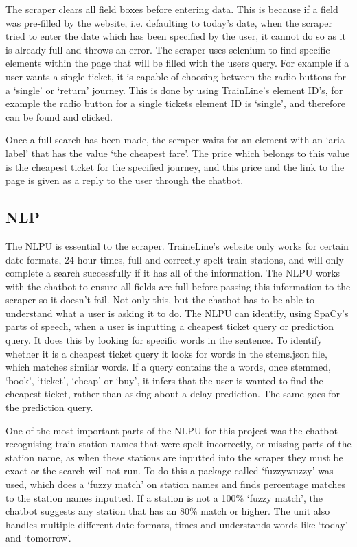 \documentclass[11pt]{article}
\begin{document}
	The scraper clears all field boxes before entering data. This is because if a field was pre-filled by the website, i.e. defaulting to today's date, when the scraper tried to enter the date which has been specified by the user, it cannot do so as it is already full and throws an error. The scraper uses selenium to find specific elements within the page that will be filled with the users query. For example if a user wants a single ticket, it is capable of choosing between the radio buttons for a `single’ or `return’ journey. This is done by using TrainLine’s element ID’s, for example the radio button for a single tickets element ID is `single’, and therefore can be found and clicked. 
	
	Once a full search has been made, the scraper waits for an element with an `aria-label’ that has the value `the cheapest fare’. The price which belongs to this value is the cheapest ticket for the specified journey, and this price and the link to the page is given as a reply to the user through the chatbot.	
	
	\subsection{NLP}
	The NLPU is essential to the scraper. TraineLine’s website only works for certain date formats, 24 hour times, full and correctly spelt train stations, and will only complete a search successfully if it has all of the information. The NLPU works with the chatbot to ensure all fields are full before passing this information to the scraper so it doesn’t fail. Not only this, but the chatbot has to be able to understand what a user is asking it to do. The NLPU can identify, using SpaCy’s \citet{Spacydoc} parts of speech, when a user is inputting a cheapest ticket query or prediction query. It does this by looking for specific words in the sentence. To identify whether it is a cheapest ticket query it looks for words in the stems.json file, which matches similar words. If a query contains the a words, once stemmed,  `book’, `ticket’, `cheap’ or `buy’, it infers that the user is wanted to find the cheapest ticket, rather than asking about a delay prediction. The same goes for the prediction query. 
	
	One of the most important parts of the NLPU for this project was the chatbot recognising train station names that were spelt incorrectly, or missing parts of the station name, as when these stations are inputted into the scraper they must be exact or the search will not run. To do this a package called ‘fuzzywuzzy’ was used, which does a ‘fuzzy match’ on station names and finds percentage matches to the station names inputted. If a station is not a 100\% `fuzzy match’, the chatbot suggests any station that has an 80\% match or higher. The unit also handles multiple different date formats, times and understands words like ‘today’ and ‘tomorrow’. 
	
\end{document}
